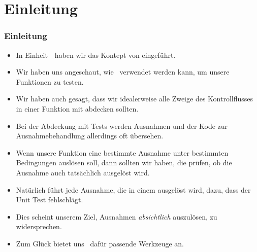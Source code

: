\documentclass[aspectratio=169,mathserif,notheorems]{beamer}%
\subtitle{33.~Zwischenspiel:~Testen auf Ausnahmen}%
\begin{document}
%
%
\startPresentation%
%
\section{Einleitung}%
\begin{frame}%
\frametitle{Einleitung}%
\begin{itemize}%
\item In Einheit~\unitUnitTests\ haben wir das Kontept von  eingeführt.%
%
\item<2-> Wir haben uns angeschaut, wie \pytest\ verwendet werden kann, um unsere Funktionen zu testen.%
%
\item<3-> Wir haben auch gesagt, dass wir idealerweise alle Zweige des Kontrollflusses in einer Funktion mit  abdecken sollten.%
%
\item<4-> Bei der Abdeckung mit Tests werden Ausnahmen und der Kode zur Ausnahmebehandlung allerdings oft übersehen\cite{LRBP2021AEHTPIOSL}.%
%
\item<5-> Wenn unsere Funktion eine bestimmte Ausnahme unter bestimmten Bedingungen auslösen soll, dann sollten wir  haben, die prüfen, ob die Ausnahme auch tatsächlich ausgelöst wird.%
%
\item<6-> Natürlich führt jede Ausnahme, die in einem  ausgelöst wird, dazu, dass der Unit Test fehlschlägt.%
%
\item<7-> Dies scheint unserem Ziel, Ausnahmen \emph{absichtlich} auszulösen, zu widersprechen.%
%
\item<8-> Zum Glück bietet uns \pytest\ dafür passende Werkzeuge an.%
\end{itemize}%
\end{frame}%
%
%
\end{document}

